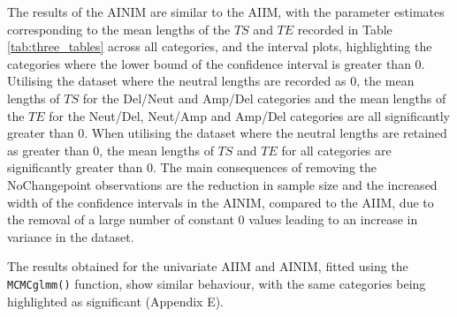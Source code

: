 The results of the AINIM are similar to the AIIM, with the parameter estimates corresponding to the mean lengths of the $TS$ and $TE$ recorded in Table \ref{tab:three_tables} across all categories, and the interval plots, highlighting the categories where the lower bound of the confidence interval is greater than 0. Utilising the dataset where the neutral lengths are recorded as 0, the mean lengths of $TS$ for the Del/Neut and Amp/Del categories and the mean lengths of the $TE$ for the Neut/Del, Neut/Amp and Amp/Del categories are all significantly greater than 0. When utilising the dataset where the neutral lengths are retained as greater than 0, the mean lengths of $TS$ and $TE$ for all categories are significantly greater than 0. The main consequences of removing the NoChangepoint observations are the reduction in sample size and the increased width of the confidence intervals in the AINIM, compared to the AIIM, due to the removal of a large number of constant 0 values leading to an increase in variance in the dataset. 

The results obtained for the univariate AIIM and AINIM, fitted using the \texttt{MCMCglmm()} function, show similar behaviour, with the same categories being highlighted as significant (Appendix E).


